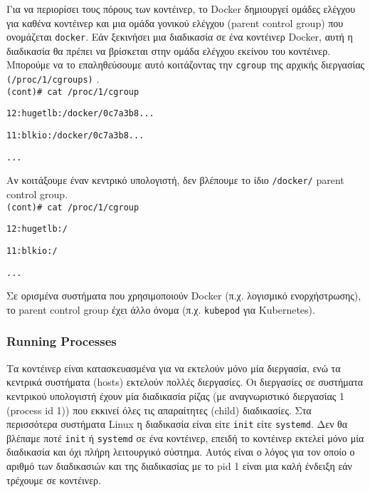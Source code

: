 Για να περιορίσει τους πόρους των κοντέινερ, το \textlatin{Docker} δημιουργεί
ομάδες ελέγχου για καθένα κοντέινερ και μια ομάδα γονικού ελέγχου
(\textlatin{parent control group}) που ονομάζεται \texttt{\textlatin{docker}}.
Εάν ξεκινήσει μια διαδικασία σε ένα κοντέινερ \textlatin{Docker}, αυτή η
διαδικασία θα πρέπει να βρίσκεται στην ομάδα ελέγχου εκείνου του κοντέινερ.
Μπορούμε να το επαληθεύσουμε αυτό κοιτάζοντας την \texttt{\textlatin{cgroup}}
της αρχικής διεργασίας \texttt{\textlatin{(/proc/1/cgroups)}}
\cite{Metasploit-Linux-Gather-Container-Detection}. \\

\texttt{\textlatin{(cont)\# cat /proc/1/cgroup}}

\texttt{\textlatin{12:hugetlb:/docker/0c7a3b8...}}

\texttt{\textlatin{11:blkio:/docker/0c7a3b8...}}

\texttt{\textlatin{...}}

Αν κοιτάξουμε έναν κεντρικό υπολογιστή, δεν βλέπουμε το ίδιο
\texttt{\textlatin{/docker/}} \textlatin{parent control group}. \\

\texttt{\textlatin{(cont)\# cat /proc/1/cgroup}}

\texttt{\textlatin{12:hugetlb:/}}

\texttt{\textlatin{11:blkio:/}}

\texttt{\textlatin{...}}

Σε ορισμένα συστήματα που χρησιμοποιούν \textlatin{Docker} (π.χ. λογισμικό
ενορχήστρωσης), το \textlatin{parent control group} έχει άλλο όνομα (π.χ.
\texttt{\textlatin{kubepod}} για \textlatin{Kubernetes}).

\subsubsection{\textlatin{Running Processes}}

Τα κοντέινερ είναι κατασκευασμένα για να εκτελούν μόνο μία διεργασία, ενώ τα
κεντρικά συστήματα (\textlatin{hosts}) εκτελούν πολλές διεργασίες. Οι
διεργασίες σε συστήματα κεντρικού υπολογιστή έχουν μία διαδικασία ρίζας
(με αναγνωριστικό διεργασίας 1 (\textlatin{process id 1})) που εκκινεί όλες τις
απαραίτητες (\textlatin{child}) διαδικασίες. Στα περισσότερα συστήματα
\textlatin{Linux} η διαδικασία είναι είτε \texttt{\textlatin{init}} είτε
\texttt{\textlatin{systemd}}. Δεν θα βλέπαμε ποτέ \texttt{\textlatin{init}} ή
\texttt{\textlatin{systemd}} σε ένα κοντέινερ, επειδή το κοντέινερ εκτελεί μόνο
μία διαδικασία και όχι πλήρη λειτουργικό σύστημα. Αυτός είναι ο λόγος για τον
οποίο ο αριθμό των διαδικασιών και της διαδικασίας με το \textlatin{pid} 1 είναι
μια καλή ένδειξη εάν τρέχουμε σε κοντέινερ.

